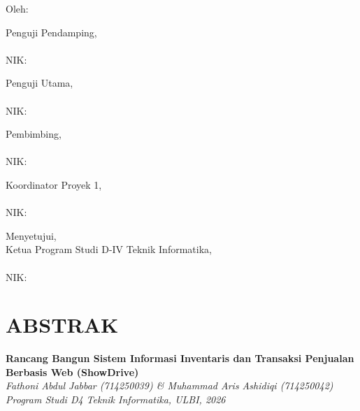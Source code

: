 \documentclass[11pt, a5paper]{article}
\begin{document}
\vspace{0.9cm}
Oleh:

\vspace{0.5cm}
\noindent
\begin{minipage}[t]{0.48\textwidth}
  Penguji Pendamping,\\[2.2cm]
  \underline{\hspace{4.5cm}}\\NIK:
\end{minipage}\hfill
\begin{minipage}[t]{0.48\textwidth}
  Penguji Utama,\\[2.2cm]
  \underline{\hspace{4.5cm}}\\NIK:
\end{minipage}

\vspace{0.9cm}
\noindent
\begin{minipage}[t]{0.48\textwidth}
  Pembimbing,\\[2.2cm]
  \underline{\hspace{4.5cm}}\\NIK:
\end{minipage}\hfill
\begin{minipage}[t]{0.48\textwidth}
  Koordinator Proyek 1,\\[2.2cm]
  \underline{\hspace{4.5cm}}\\NIK:
\end{minipage}

\vspace{0.9cm}
\noindent
Menyetujui,\\
Ketua Program Studi D-IV Teknik Informatika,\\[2.2cm]
\underline{\hspace{5cm}}\\NIK:

\newpage
\section*{ABSTRAK}

\noindent\textbf{Rancang Bangun Sistem Informasi Inventaris dan Transaksi
Penjualan Berbasis Web (ShowDrive)}\\[5pt]
\noindent\textit{Fathoni Abdul Jabbar (714250039) \& Muhammad Aris Ashidiqi
(714250042)}\\
\noindent\textit{Program Studi D4 Teknik Informatika, ULBI, 2026}
\end{document}
